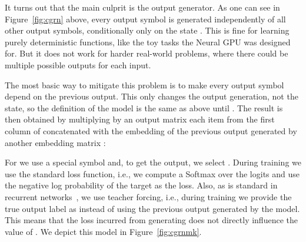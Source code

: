 \documentclass{article}
\begin{document}
It turns out that the main culprit is the output generator.
As one can see in Figure~\ref{fig:cgrn} above, every output
symbol is generated independently of all other output symbols,
conditionally only on the state .
This is fine for learning purely deterministic functions,
like the toy tasks the Neural GPU was designed for. But it does
not work for harder real-world problems, where there could be multiple
possible outputs for each input.

The most basic way to mitigate this problem is to make every
output symbol depend on the previous output. This only changes
the output generation, not the state, so the definition of the
model is the same as above until . The result is then
obtained by multiplying by an output matrix  each item from
the first column of  concatenated with the embedding of
the previous output generated by another embedding matrix :

For  we use a special symbol  and,
to get the output, we select .
During training we use the standard loss function, i.e.,
we compute a Softmax over the logits  and
use the negative log probability of the target as the loss.
Also, as is standard in recurrent networks~\cite{sutskever14}, we use
teacher forcing, i.e., during training we provide the true output
label as  instead of using the previous output generated
by the model. This means that the loss incurred from generating  does not directly influence the value of .
We depict this model in Figure~\ref{fig:cgrnmk}.
\end{document}
